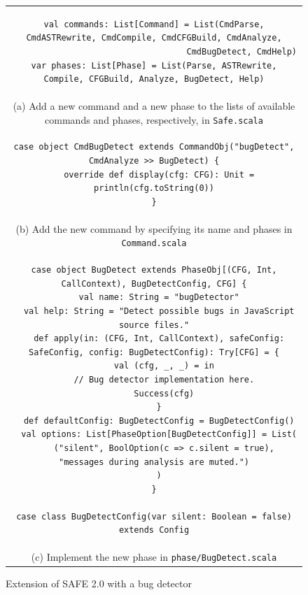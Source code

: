 \documentclass[10pt, conference]{IEEEtran}
\newcommand{\mtt}[1]{\texttt{\small #1}}
\newcommand{\safe}{{SAFE 2.0}\xspace}
\begin{document}
\setcounter{figure}{1}
\begin{figure}[t]
\centering
\begin{tabular}{c}
\begin{minipage}{.95\textwidth}
\footnotesize
\begin{verbatim}
val commands: List[Command] = List(CmdParse, CmdASTRewrite, CmdCompile, CmdCFGBuild, CmdAnalyze,
                                   CmdBugDetect, CmdHelp)
var phases: List[Phase] = List(Parse, ASTRewrite, Compile, CFGBuild, Analyze, BugDetect, Help)
\end{verbatim}
\end{minipage}
\\[1.5em]
{\small (a) Add a new command and a new phase to the lists of available
commands and phases, respectively, in {\tt Safe.scala}}
\\[1em]
\begin{minipage}{.95\textwidth}
\footnotesize
\begin{verbatim}
case object CmdBugDetect extends CommandObj("bugDetect", CmdAnalyze >> BugDetect) {
  override def display(cfg: CFG): Unit = println(cfg.toString(0))
}
\end{verbatim}
\end{minipage}
\\[1em]
{\small (b) Add the new command by specifying its name and phases in {\tt Command.scala}}
\\[1em]
\begin{minipage}{.95\textwidth}
\footnotesize
\begin{verbatim}
case object BugDetect extends PhaseObj[(CFG, Int, CallContext), BugDetectConfig, CFG] {
  val name: String = "bugDetector"
  val help: String = "Detect possible bugs in JavaScript source files."
  def apply(in: (CFG, Int, CallContext), safeConfig: SafeConfig, config: BugDetectConfig): Try[CFG] = {
    val (cfg, _, _) = in
    // Bug detector implementation here.
    Success(cfg)
  }
  def defaultConfig: BugDetectConfig = BugDetectConfig()
  val options: List[PhaseOption[BugDetectConfig]] = List(
    ("silent", BoolOption(c => c.silent = true), "messages during analysis are muted.")
  )
}

case class BugDetectConfig(var silent: Boolean = false) extends Config

\end{verbatim}
\end{minipage}
\\
{\small (c) Implement the new phase in \mtt{phase/BugDetect.scala}}
\end{tabular}
\caption{\small Extension of \safe with a bug detector~\cite{safewapp}}
\label{fig:extensibility}
\end{figure}
\end{document}
